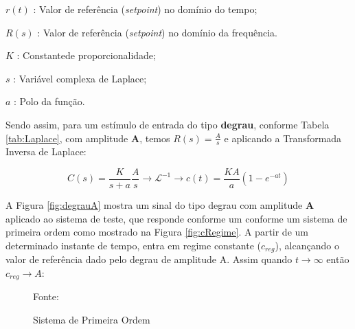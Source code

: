 $r(t)$ : Valor de referência (\emph{setpoint}) no domínio do tempo;

$R(s)$ : Valor de referência (\emph{setpoint}) no domínio da frequência.

$K$ : Constantede proporcionalidade;

$s$ : Variável complexa de Laplace;

$a$ : Polo da função.
\setlength{\parindent}{1cm}

Sendo assim, para um estímulo de entrada do tipo \textbf{degrau}, conforme Tabela \ref{tab:Laplace}, com amplitude \textbf{A}, temos $ R(s) = \frac{A}{s}$ e aplicando a Transformada Inversa de Laplace:

\begin{equation}
C(s) = \frac{K}{s+a} \frac{A}{s} \rightarrow \mathscr{L}^{-1} \to c(t) = \frac{K A}{a} (1 - e^{-at})
\label{eq:degrauA}
\end{equation}

A Figura \ref{fig:degrauA} mostra um sinal do tipo degrau com amplitude \textbf{A} aplicado ao sistema de teste, que responde conforme um conforme um sistema de primeira ordem como mostrado na Figura \ref{fig:cRegime}. A partir de um determinado instante de tempo, entra em regime constante ($c_{reg}$), alcançando o valor de referência dado pelo degrau de amplitude A. Assim quando $ t \rightarrow \infty $  então $ c_{reg} \rightarrow A $:


\begin{figure}
\centering
\caption{Sistema de Primeira Ordem}
\label{fig:sistPrimeiraOrdem}

{\small Fonte: \cite{Ogata}}
\end{figure}

